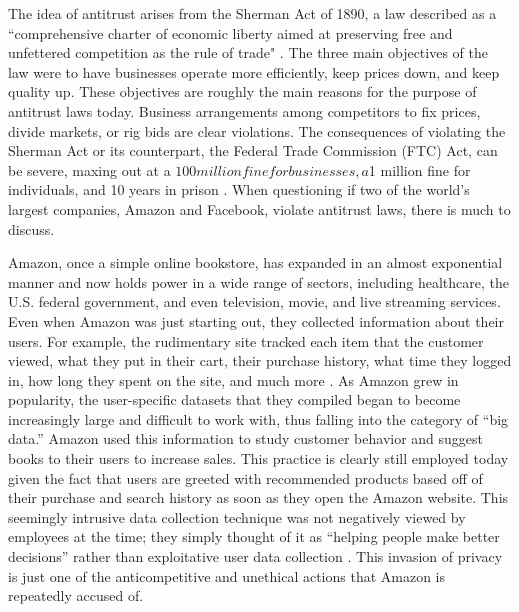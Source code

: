 \documentclass[twoside]{article}
\begin{document}
The idea of antitrust arises from the Sherman Act of 1890, a law described as a “comprehensive charter of economic liberty aimed at preserving free and unfettered competition as the rule of trade" \cite{ftc}. The three main objectives of the law were to have businesses operate more efficiently, keep prices down, and keep quality up. These objectives are roughly the main reasons for the purpose of antitrust laws today. Business arrangements among competitors to fix prices, divide markets, or rig bids are clear violations. The consequences of violating the Sherman Act or its counterpart, the Federal Trade Commission (FTC) Act, can be severe, maxing out at a $100 million fine for businesses, a $1 million fine for individuals, and 10 years in prison \cite{ftc}. When questioning if two of the world’s largest companies, Amazon and Facebook, violate antitrust laws, there is much to discuss.

Amazon, once a simple online bookstore, has expanded in an almost exponential manner and now holds power in a wide range of sectors, including healthcare, the U.S. federal government, and even television, movie, and live streaming services. Even when Amazon was just starting out, they collected information about their users. For example, the rudimentary site tracked each item that the customer viewed, what they put in their cart, their purchase history, what time they logged in, how long they spent on the site, and much more \cite{amazon1}. As Amazon grew in popularity, the user-specific datasets that they compiled began to become increasingly large and difficult to work with, thus falling into the category of “big data.” Amazon used this information to study customer behavior and suggest books to their users to increase sales. This practice is clearly still employed today given the fact that users are greeted with recommended products based off of their purchase and search history as soon as they open the Amazon website. This seemingly intrusive data collection technique was not negatively viewed by employees at the time; they simply thought of it as “helping people make better decisions” rather than exploitative user data collection \cite{amazon1}. This invasion of privacy is just one of the anticompetitive and unethical actions that Amazon is repeatedly accused of.
\end{document}
